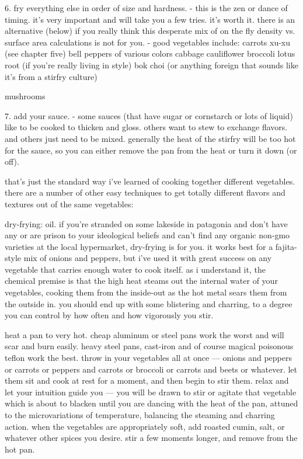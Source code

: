 6. fry everything else in order of size and hardness.
	- this is the zen or dance of timing. it's very important and will take you a few tries. it's worth it. there is an alternative (below) if you really think this desperate mix of on the fly density vs. surface area calculations is not for you.
	- good vegetables include:
	carrots
	xu-xu	(see chapter five)
	bell peppers of various colors
	cabbage
	cauliflower
	broccoli
	lotus root	(if you're really living in style)
	bok choi	(or anything foreign that sounds like it's from a stirfry culture)

	mushrooms

7. add your sauce.
	- some sauces (that have sugar or cornstarch or lots of liquid) like to be cooked to thicken and gloss. others want to stew to exchange flavors. and others just need to be mixed. generally the heat of the stirfry will be too hot for the sauce, so you can either remove the pan from the heat or turn it down (or off).

that's just the standard way i've learned of cooking together different vegetables. there are a number of other easy techniques to get totally different flavors and textures out of the same vegetables:

dry-frying:
	oil. if you're stranded on some lakeside in patagonia and don't have any or are prison to your ideological beliefs and can't find any organic non-gmo varieties at the local hypermarket, dry-frying is for you. it works best for a fajita-style mix of onions and peppers, but i've used it with great success on any vegetable that carries enough water to cook itself. as i understand it, the chemical premise is that the high heat steams out the internal water of your vegetables, cooking them from the inside-out as the hot metal sears them from the outside in. you should end up with some blistering and charring, to a degree you can control by how often and how vigorously you stir. 

	heat a pan to very hot. cheap aluminum or steel pans work the worst and will scar and burn easily. heavy steel pans, cast-iron and of course magical poisonous teflon work the best. throw in your vegetables all at once --- onions and peppers or carrots or peppers and carrots or broccoli or carrots and beets or whatever. let them sit and cook at rest for a moment, and then begin to stir them. relax and let your intuition guide you --- you will be drawn to stir or agitate that vegetable which is about to blacken until you are dancing with the heat of the pan, attuned to the microvariations of temperature, balancing the steaming and charring action. when the vegetables are appropriately soft, add roasted cumin, salt, or whatever other spices you desire. stir a few moments longer, and remove from the hot pan.

